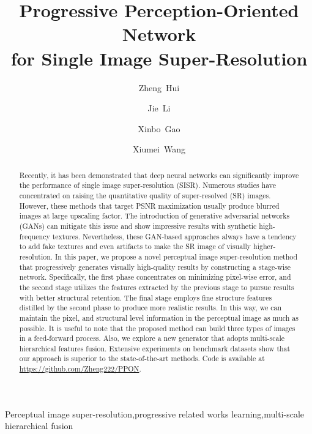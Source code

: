 \documentclass[preprint]{elsarticle}
\begin{document}
\begin{frontmatter}

\title{Progressive Perception-Oriented Network \\ for Single Image Super-Resolution}

\author[Xidian]{Zheng~Hui}

\author[Xidian]{Jie~Li}

\author[Xidian,Chongqing]{Xinbo~Gao}

\author[Xidian]{Xiumei~Wang}

\address[Xidian]{Video \& Image Processing System (VIPS) Lab, School of Electronic Engineering, Xidian University, No.2, South Taibai Road, Xi'an 710071, China}
\address[Chongqing]{The Chongqing Key Laboratory of Image Cognition, Chongqing University of Posts and Telecommunications, Chongqing 400065, China}

\begin{abstract}
Recently, it has been demonstrated that deep neural networks can significantly improve the performance of single image super-resolution (SISR). Numerous studies have concentrated on raising the quantitative quality of super-resolved (SR) images. However, these methods that target PSNR maximization usually produce blurred images at large upscaling factor. The introduction of generative adversarial networks (GANs) can mitigate this issue and show impressive results with synthetic high-frequency textures. Nevertheless, these GAN-based approaches always have a tendency to add fake textures and even artifacts to make the SR image of visually higher-resolution. In this paper, we propose a novel perceptual image super-resolution method that progressively generates visually high-quality results by constructing a stage-wise network. Specifically, the first phase concentrates on minimizing pixel-wise error, and the second stage utilizes the features extracted by the previous stage to pursue results with better structural retention. The final stage employs fine structure features distilled by the second phase to produce more realistic results. In this way, we can maintain the pixel, and structural level information in the perceptual image as much as possible. It is useful to note that the proposed method can build three types of images in a feed-forward process. Also, we explore a new generator that adopts multi-scale hierarchical features fusion. Extensive experiments on benchmark datasets show that our approach is superior to the state-of-the-art methods. Code is available at \url{https://github.com/Zheng222/PPON}.
\end{abstract}

\begin{keyword}
Perceptual image super-resolution\sep progressive related works learning\sep multi-scale hierarchical fusion
\end{keyword}

\end{frontmatter}
\end{document}
